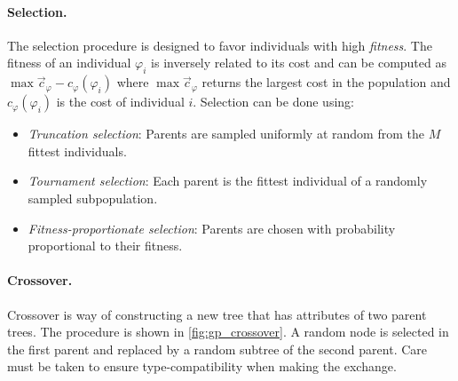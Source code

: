 \paragraph{Selection.} The selection procedure is designed to favor individuals with high \emph{fitness}. The fitness of an individual $\varphi_i$ is inversely related to its cost and can be computed as $\max \vec{c}_\varphi - c_\varphi(\varphi_i)$ where $\max \vec{c}_\varphi$ returns the largest cost in the population and $c_\varphi(\varphi_i)$ is the cost of individual $i$. Selection can be done using:
\begin{itemize}
    \item \emph{Truncation selection}: Parents are sampled uniformly at random from the $M$ fittest individuals.
    \item \emph{Tournament selection}: Each parent is the fittest individual of a randomly sampled subpopulation.
    \item \emph{Fitness-proportionate selection}: Parents are chosen with probability proportional to their fitness.
\end{itemize}

\paragraph{Crossover.} Crossover is way of constructing a new tree that has attributes of two parent trees. The procedure is shown in \cref{fig:gp_crossover}. A random node is selected in the first parent and replaced by a random subtree of the second parent. Care must be taken to ensure type-compatibility when making the exchange. 


